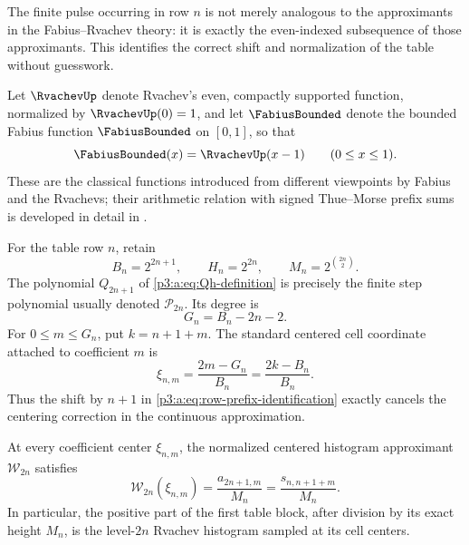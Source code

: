 \documentclass[11pt,oneside]{article}
\numberwithin{equation}{section}
\theoremstyle{definition}
\theoremstyle{remark}
\begin{document}
The finite pulse occurring in row \(n\) is not merely analogous to the
approximants in the Fabius--Rvachev theory: it is exactly the even-indexed
subsequence of those approximants.  This identifies the correct shift and
normalization of the table without guesswork.

Let \(\RvachevUp\) denote Rvachev's even, compactly supported function, normalized
by \(\RvachevUp(0)=1\), and let \(\FabiusBounded\) denote the bounded Fabius function $\FabiusBounded$ on
\([0,1]\), so that
\begin{equation}
 \FabiusBounded(x)=\RvachevUp(x-1)\qquad(0\leq x\leq1).                       \label{p3:c:eq:F-up}
\end{equation}
These are the classical functions introduced from different viewpoints by
Fabius and the Rvachevs; their arithmetic relation with signed Thue--Morse
prefix sums is developed in detail in \cite{p3:fabius,p3:rvachev1971,p3:arias2018,p3:proveit}.

For the table row \(n\), retain
\begin{equation}
 B_n=2^{2n+1},\qquad H_n=2^{2n},\qquad
 M_n=2^{\binom{2n}{2}}.                                   \label{p3:c:eq:BHM-row}
\end{equation}
The polynomial \(Q_{2n+1}\) of \cref{p3:a:eq:Qh-definition} is precisely the finite
step polynomial usually denoted \(\mathcal P_{2n}\).  Its degree is
\begin{equation}
 G_n=B_n-2n-2.                                             \label{p3:c:eq:Gn}
\end{equation}
For \(0\leq m\leq G_n\), put \(k=n+1+m\).  The standard centered cell
coordinate attached to coefficient \(m\) is
\begin{equation}
 \xi_{n,m}=\frac{2m-G_n}{B_n}
           =\frac{2k-B_n}{B_n}.                           \label{p3:c:eq:row-center}
\end{equation}
Thus the shift by \(n+1\) in \cref{p3:a:eq:row-prefix-identification} exactly cancels the
centering correction in the continuous approximation.

\begin{proposition}
\label{p3:c:prop:row-histogram}
At every coefficient center \(\xi_{n,m}\), the normalized centered
histogram approximant \(\mathcal W_{2n}\) satisfies
\begin{equation}
 \mathcal W_{2n}(\xi_{n,m})
 =\frac{a_{2n+1,m}}{M_n}
 =\frac{s_{n,n+1+m}}{M_n}.                                \label{p3:c:eq:row-histogram}
\end{equation}
In particular, the positive part of the first table block, after division
by its exact height \(M_n\), is the level-\(2n\) Rvachev histogram sampled
at its cell centers.
\end{proposition}
\end{document}
